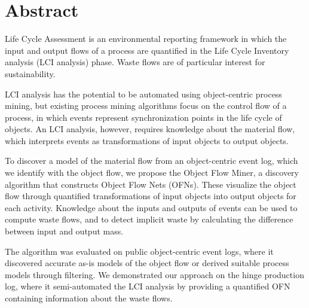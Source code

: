 \chapter*{Abstract}

Life Cycle Assessment is an environmental reporting framework in which the input and output flows of a process are quantified in the Life Cycle Inventory analysis (LCI analysis) phase.
Waste flows are of particular interest for sustainability.

LCI analysis has the potential to be automated using object-centric process mining, but existing process mining algorithms focus on the control flow of a process, in which events represent synchronization points in the life cycle of objects.
An LCI analysis, however, requires knowledge about the material flow, which interprets events as transformations of input objects to output objects.


To discover a model of the material flow from an object-centric event log, which we identify with the object flow, we propose the Object Flow Miner, a discovery algorithm that constructs Object Flow Nets (OFNs).
These visualize the object flow through quantified transformations of input objects into output objects for each activity.
Knowledge about the inputs and outputs of events can be used to compute waste flows, and to detect implicit waste by calculating the difference between input and output mass.


The algorithm was evaluated on public object-centric event logs, where it discovered accurate as-is models of the object flow or derived suitable process models through filtering.
We demonstrated our approach on the hinge production log, where it semi-automated the LCI analysis by providing a quantified OFN containing information about the waste flows.
